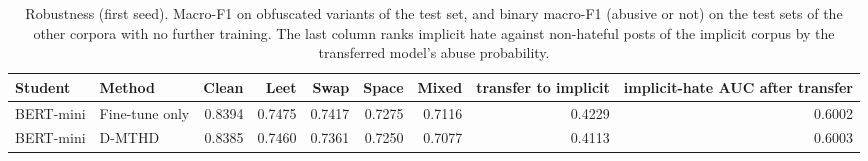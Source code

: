 \begin{table}[t]
\centering
\caption{Robustness (first seed). Macro-F1 on obfuscated variants of the test set, and binary macro-F1 (abusive or not) on the test sets of the other corpora with no further training. The last column ranks implicit hate against non-hateful posts of the implicit corpus by the transferred model's abuse probability.}
\label{tab:robustness}
\begin{tabular}{llrrrrrrr}
\toprule
Student & Method & Clean & Leet & Swap & Space & Mixed & transfer to implicit & implicit-hate AUC after transfer \\
\midrule
BERT-mini & Fine-tune only & 0.8394 & 0.7475 & 0.7417 & 0.7275 & 0.7116 & 0.4229 & 0.6002 \\
BERT-mini & D-MTHD & 0.8385 & 0.7460 & 0.7361 & 0.7250 & 0.7077 & 0.4113 & 0.6003 \\
\bottomrule
\end{tabular}
\end{table}